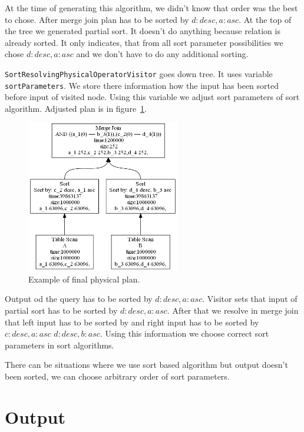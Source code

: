 At the time of generating this algorithm, we didn't know that order was the best to chose. After merge join plan has to be sorted by $d:desc,a:asc$. At the top of the tree we generated partial sort. It doesn't do anything because relation is already sorted. It only indicates, that from all sort parameter possibilities we chose $d:desc,a:asc$ and we don't have to do any additional sorting.

\texttt{SortResolvingPhysicalOperatorVisitor} goes down tree. It uses variable \texttt{sortParameters}. We store there information how the input has been sorted before input of visited node. Using this variable we adjust sort parameters of sort algorithm. Adjusted plan is in figure~\ref{fig:plansortresolved}.

\begin{figure}[h!]
  \centering
    \includegraphics[width=0.6\textwidth]{plansortresolved}

      \caption{Example of final physical plan.}
          \label{fig:plansortresolved}
\end{figure}

Output od the query has to be sorted by $d:desc,a:asc$. Visitor sets that input of partial sort has to be sorted by $d:desc,a:asc$. After that we resolve in merge join that left input has to be sorted by and right input has to be sorted by $c:desc,a:asc$ $d:desc,b:asc$. Using this information we choose correct sort parameters in sort algorithms. 

There can be situations where we use sort based algorithm but output doesn't been sorted, we can choose arbitrary order of sort parameters. 


\section{Output}

